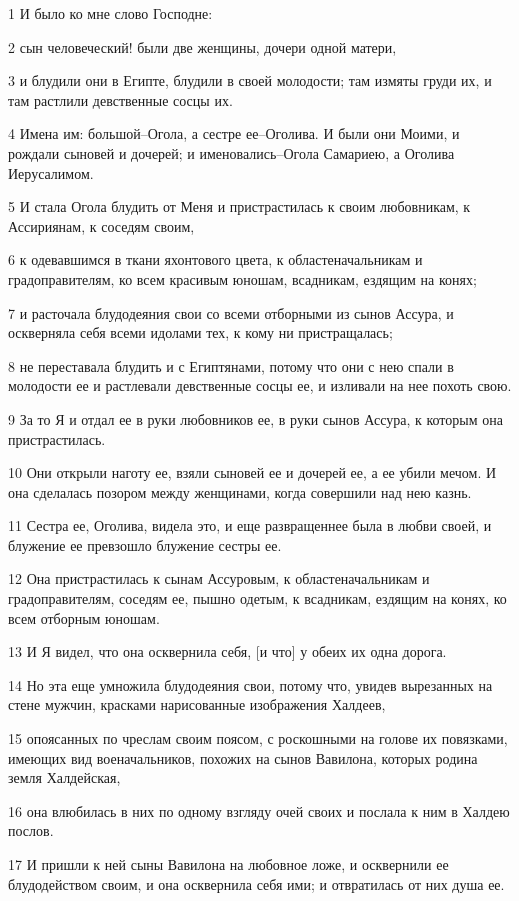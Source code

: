 \par 1 И было ко мне слово Господне:
\par 2 сын человеческий! были две женщины, дочери одной матери,
\par 3 и блудили они в Египте, блудили в своей молодости; там измяты груди их, и там растлили девственные сосцы их.
\par 4 Имена им: большой--Огола, а сестре ее--Оголива. И были они Моими, и рождали сыновей и дочерей; и именовались--Огола Самариею, а Оголива Иерусалимом.
\par 5 И стала Огола блудить от Меня и пристрастилась к своим любовникам, к Ассириянам, к соседям своим,
\par 6 к одевавшимся в ткани яхонтового цвета, к областеначальникам и градоправителям, ко всем красивым юношам, всадникам, ездящим на конях;
\par 7 и расточала блудодеяния свои со всеми отборными из сынов Ассура, и оскверняла себя всеми идолами тех, к кому ни пристращалась;
\par 8 не переставала блудить и с Египтянами, потому что они с нею спали в молодости ее и растлевали девственные сосцы ее, и изливали на нее похоть свою.
\par 9 За то Я и отдал ее в руки любовников ее, в руки сынов Ассура, к которым она пристрастилась.
\par 10 Они открыли наготу ее, взяли сыновей ее и дочерей ее, а ее убили мечом. И она сделалась позором между женщинами, когда совершили над нею казнь.
\par 11 Сестра ее, Оголива, видела это, и еще развращеннее была в любви своей, и блужение ее превзошло блужение сестры ее.
\par 12 Она пристрастилась к сынам Ассуровым, к областеначальникам и градоправителям, соседям ее, пышно одетым, к всадникам, ездящим на конях, ко всем отборным юношам.
\par 13 И Я видел, что она осквернила себя, [и что] у обеих их одна дорога.
\par 14 Но эта еще умножила блудодеяния свои, потому что, увидев вырезанных на стене мужчин, красками нарисованные изображения Халдеев,
\par 15 опоясанных по чреслам своим поясом, с роскошными на голове их повязками, имеющих вид военачальников, похожих на сынов Вавилона, которых родина земля Халдейская,
\par 16 она влюбилась в них по одному взгляду очей своих и послала к ним в Халдею послов.
\par 17 И пришли к ней сыны Вавилона на любовное ложе, и осквернили ее блудодейством своим, и она осквернила себя ими; и отвратилась от них душа ее.
